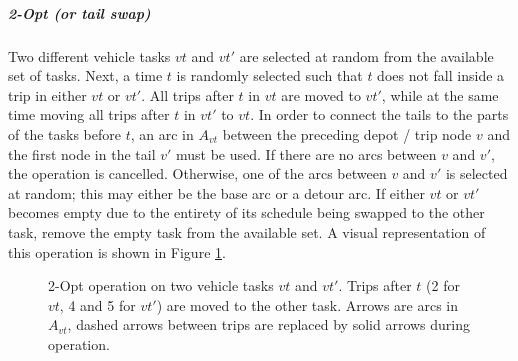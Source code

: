 \documentclass[]{article}
\begin{document}
\noindent\subparagraph{2-Opt (or tail swap)}  Two different vehicle tasks $vt$ and $vt'$ are selected at random from the available set of tasks. Next, a time $t$ is randomly selected such that $t$ does not fall inside a trip in either $vt$ or $vt'$. All trips after $t$ in $vt$ are moved to $vt'$, while at the same time moving all trips after $t$ in $vt'$ to $vt$. In order to connect the tails to the parts of the tasks before $t$, an arc in $A_{vt}$ between the preceding depot / trip node $v$ and the first node in the tail $v'$ must be used. If there are no arcs between $v$ and $v'$, the operation is cancelled. Otherwise, one of the arcs between $v$ and $v'$ is selected at random; this may either be the base arc or a detour arc. If either $vt$ or $vt'$ becomes empty due to the entirety of its schedule being swapped to the other task, remove the empty task from the available set. A visual representation of this operation is shown in Figure \ref{fig:2opt-vt}.
\begin{figure}[H]
  \centering
  \caption{2-Opt operation on two vehicle tasks $vt$ and $vt'$. Trips after $t$ (2 for $vt$, 4 and 5 for $vt'$) are moved to the other task. Arrows are arcs in $A_{vt}$, dashed arrows between trips are replaced by solid arrows during operation.}
  \label{fig:2opt-vt}
\end{figure}
\end{document}
